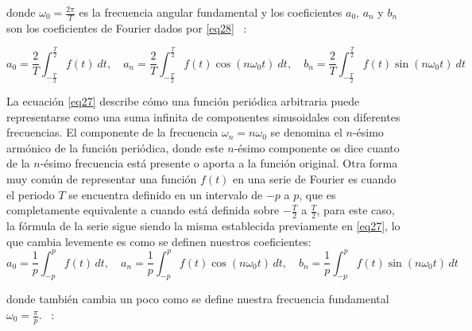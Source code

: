 donde $\omega_0 = \frac{2\pi}{T}$ es la frecuencia angular fundamental y los coeficientes $a_0$, $a_n$ y $b_n$ son los coeficientes de Fourier dados por \eqref{eq28} ~\cite{fourierHsu}: 

\begin{equation}\label{eq28}
	a_0 = \frac{2}{T} \int_{-\frac{T}{2}}^{\frac{T}{2}} f(t) \ dt, \quad a_n = \frac{2}{T} \int_{-\frac{T}{2}}^{\frac{T}{2}} f(t) \cos(n\omega_0 t) \ dt, \quad b_n = \frac{2}{T} \int_{-\frac{T}{2}}^{\frac{T}{2}} f(t) \sin(n\omega_0 t) \ dt
\end{equation}

La ecuación \eqref{eq27} describe cómo una función periódica arbitraria puede representarse como una suma infinita de componentes sinusoidales con diferentes frecuencias. El componente de la frecuencia $\omega_n = n\omega_0$ se denomina el $n$-ésimo armónico de la función periódica, donde este $n$-ésimo componente os dice cuanto de la $n$-ésimo frecuencia está presente o aporta a la función original.\newline
Otra forma muy común de representar una función $f(t)$ en una serie de Fourier es cuando el periodo $T$ se encuentra definido en un intervalo de $-p$ a $p$, que es completamente equivalente a cuando está definida sobre $-\frac{T}{2}$ a $\frac{T}{2}$, para este caso, la fórmula de la serie sigue siendo la misma establecida previamente en \eqref{eq27}, lo que cambia levemente es como se definen nuestros coeficientes: ~\cite{matesAvanzadasZill}
\begin{equation}\label{eq29}
	a_0 = \frac{1}{p} \int_{-p}^{p} f(t) \, dt, \quad a_n = \frac{1}{p} \int_{-p}^{p} f(t) \cos(n\omega_0 t) \, dt, \quad b_n = \frac{1}{p} \int_{-p}^{p} f(t) \sin(n\omega_0 t) \, dt
\end{equation}

donde también cambia un poco como se define nuestra frecuencia fundamental $\omega_0 = \frac{\pi}{p}$. ~\cite{matesAvanzadasZill}: 

